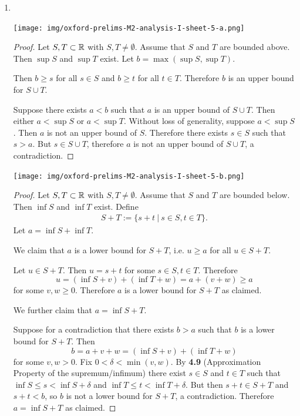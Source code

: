 \begin{enumerate}
\item~\\
  \begin{mdframed}
    \texttt{[image: img/oxford-prelims-M2-analysis-I-sheet-5-a.png]}
  \end{mdframed}

  \begin{proof}
    Let $S, T \subset \mathbb{R}$ with $S, T \neq \emptyset$. Assume that $S$ and $T$ are bounded
    above. Then $\sup S$ and $\sup T$ exist. Let $b = \max(\sup S, \sup T)$.

    Then $b \geq s$ for all $s \in S$ and $b \geq t$ for all $t \in T$. Therefore $b$ is an upper
    bound for $S \cup T$.

    Suppose there exists $a < b$ such that $a$ is an upper bound of $S \cup T$. Then either
    $a < \sup S$ or $a < \sup T$. Without loss of generality, suppose $a < \sup S$. Then $a$ is not
    an upper bound of $S$. Therefore there exists $s \in S$ such that $s > a$. But
    $s \in S \cup T$, therefore $a$ is not an upper bound of $S \cup T$, a contradiction.
  \end{proof}

  \begin{mdframed}
    \texttt{[image: img/oxford-prelims-M2-analysis-I-sheet-5-b.png]}
  \end{mdframed}

  \begin{proof}
    Let $S, T \subset \mathbb{R}$ with $S, T \neq \emptyset$. Assume that $S$ and $T$ are bounded
    below. Then $\inf S$ and $\inf T$ exist. Define
    \begin{align*}
      S + T := \{s + t ~|~ s \in S, t \in T\}.
    \end{align*}
    Let $a = \inf S + \inf T$.

    We claim that $a$ is a lower bound for $S + T$, i.e. $u \geq a$ for all $u \in S + T$.

    Let $u \in S + T$. Then $u = s + t$ for some $s \in S, t \in T$. Therefore
    $$u = (\inf S + v) + (\inf T + w) = a + (v + w) \geq a$$ for some $v, w \geq 0$. Therefore $a$ is
    a lower bound for $S + T$ as claimed.

    We further claim that $a = \inf S + T$.

    Suppose for a contradiction that there exists $b > a$ such that $b$ is a lower bound for
    $S + T$. Then $$b = a + v + w = (\inf S + v) + (\inf T + w)$$ for some $v, w > 0$. Fix
    $0 < \delta < \min(v, w)$. By {\bf 4.9} (Approximation Property of the supremum/infimum) there
    exist $s \in S$ and $t \in T$ such that $\inf S \leq s < \inf S + \delta$ and
    $\inf T \leq t < \inf T + \delta$. But then $s + t \in S + T$ and $s + t < b$, so $b$ is not a
    lower bound for $S + T$, a contradiction. Therefore $a = \inf S + T$ as claimed.
  \end{proof}


\end{enumerate}
